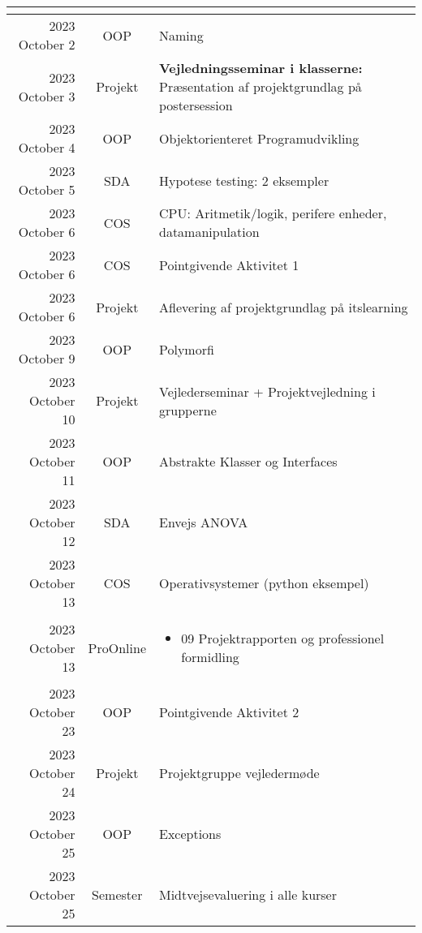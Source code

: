 \begin{longtable}{|r|c|p{}|}
\begin{itemize}[noitemsep,leftmargin=*,topsep=0pt,partopsep=0pt]
\end{itemize} \\
  \hline
  2023 October 2 & OOP & Naming \\
  \hline
  2023 October 3 & Projekt & \textbf{Vejledningsseminar i klasserne:} Præsentation af projektgrundlag på postersession \\
  \hline
  2023 October 4 & OOP & Objektorienteret Programudvikling \\
  \hline
  2023 October 5 & SDA & Hypotese testing: 2 eksempler \\
  \hline
  2023 October 6 & COS & CPU: Aritmetik/logik, perifere enheder, datamanipulation \\
  \hline
  \rowcolor{orange}2023 October 6 & COS & Pointgivende Aktivitet 1 \\
  \hline
  2023 October 6 & Projekt & Aflevering af projektgrundlag på itslearning \\
  \hline
  2023 October 9 & OOP & Polymorfi \\
  \hline
  2023 October 10 & Projekt & Vejlederseminar + Projektvejledning i grupperne \\
  \hline
  2023 October 11 & OOP & Abstrakte Klasser og Interfaces \\
  \hline
  2023 October 12 & SDA & Envejs ANOVA \\
  \hline
  2023 October 13 & COS & Operativsystemer (python eksempel) \\
  \hline
  2023 October 13 & ProOnline & \begin{itemize}[noitemsep,leftmargin=*,topsep=0pt,partopsep=0pt]

  \item 09 Projektrapporten og professionel formidling

\end{itemize} \\
  \hline
  \rowcolor{orange}2023 October 23 & OOP & Pointgivende Aktivitet 2 \\
  \hline
  2023 October 24 & Projekt & Projektgruppe vejledermøde \\
  \hline
  2023 October 25 & OOP & Exceptions \\
  \hline
  2023 October 25 & Semester & Midtvejsevaluering i alle kurser


\end{longtable}
